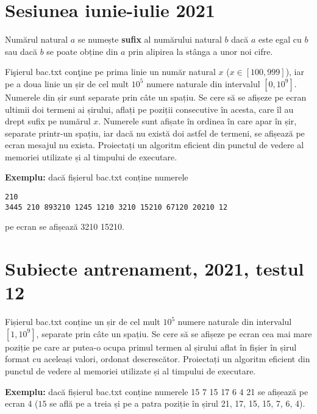 \documentclass[10pt, a4paper]{article}
\newcommand{\highlight}[1]{{\ttfamily\color{red}#1}}
\begin{document}
\section{Sesiunea iunie-iulie 2021}
Numărul natural \highlight{$a$} se numește \textbf{sufix} al numărului natural \highlight{$b$} dacă \highlight{$a$} este egal cu \highlight{$b$} sau dacă \highlight{$b$} se poate obține din \highlight{$a$} prin alipirea la stânga a unor noi cifre.

\vspace{0.2cm}
\noindent Fişierul \highlight{bac.txt} conţine pe prima linie un număr natural \highlight{$x$} (\highlight{$x \in [100,999]$}), iar pe a doua linie un șir de cel mult \highlight{$10^5$} numere naturale din intervalul \highlight{$[0,10^9]$}. Numerele din șir sunt separate prin câte un spațiu. Se cere să se afișeze pe ecran ultimii doi termeni ai șirului, aflați pe \highlight{poziții consecutive} în acesta, care îl au drept sufix pe numărul \highlight{$x$}. Numerele sunt afișate în ordinea în care apar în șir, separate printr-un spațiu, iar dacă nu există doi astfel de termeni, se afișează pe ecran mesajul \highlight{nu exista}. Proiectați un algoritm eficient din punctul de vedere al memoriei utilizate și al timpului de executare.

\vspace{0.2cm}
\noindent \textbf{Exemplu:} dacă fișierul \highlight{bac.txt} conține numerele
\begin{verbatim}
210
3445 210 893210 1245 1210 3210 15210 67120 20210 12
\end{verbatim}
pe ecran se afișează \highlight{3210 15210}.



\section{Subiecte antrenament, 2021, testul 12}
Fișierul \highlight{bac.txt} conține un șir de cel mult \highlight{$10^5$} numere naturale din intervalul \highlight{$[1,10^9]$}, separate prin câte un spațiu. Se cere să se afișeze pe ecran cea mai mare poziție pe care ar putea-o ocupa primul termen al șirului aflat în fișier în șirul format cu aceleași valori, ordonat descrescător. Proiectați un algoritm eficient din punctul de vedere al memoriei utilizate și al timpului de executare.

\vspace{0.2cm}
\noindent \textbf{Exemplu:} dacă fișierul \highlight{bac.txt} conține numerele \highlight{15 7 15 17 6 4 21} se afișează pe ecran \highlight{$4$} (\highlight{$15$} se află pe a treia și pe a patra poziție în șirul \highlight{21, 17, 15, 15, 7, 6, 4}).
\end{document}
